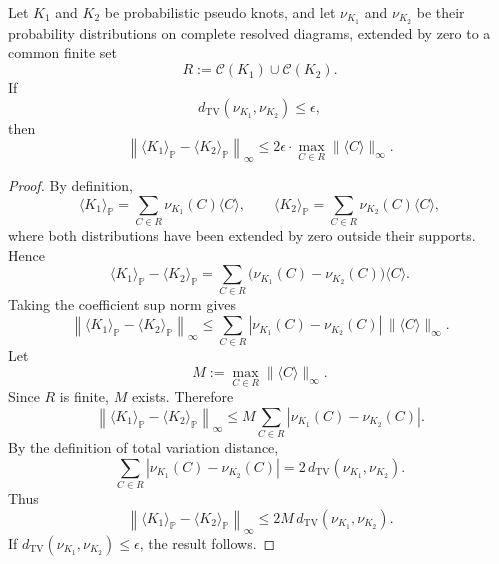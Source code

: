 \documentclass[10pt,a4paper]{amsart}
\begin{document}
\begin{theorem}\label{thm:bracket_diff_bound}
Let \(K_1\) and \(K_2\) be probabilistic pseudo knots, and let \(\nu_{K_1}\) and \(\nu_{K_2}\) be their probability distributions on complete resolved diagrams, extended by zero to a common finite set
\[
R:=\mathcal C(K_1)\cup \mathcal C(K_2).
\]
If
\[
d_{\mathrm{TV}}(\nu_{K_1},\nu_{K_2})\le \epsilon,
\]
then
\[
\left\|
\langle K_1\rangle_{\mathbb P}
-
\langle K_2\rangle_{\mathbb P}
\right\|_\infty
\le
2\epsilon
\cdot
\max_{C\in R}
\|\langle C\rangle\|_\infty .
\]
\end{theorem}

\begin{proof}
By definition,
\[
\langle K_1\rangle_{\mathbb P}
=
\sum_{C\in R}
\nu_{K_1}(C)\langle C\rangle,
\qquad
\langle K_2\rangle_{\mathbb P}
=
\sum_{C\in R}
\nu_{K_2}(C)\langle C\rangle,
\]
where both distributions have been extended by zero outside their supports. Hence
\[
\langle K_1\rangle_{\mathbb P}
-
\langle K_2\rangle_{\mathbb P}
=
\sum_{C\in R}
\big(\nu_{K_1}(C)-\nu_{K_2}(C)\big)
\langle C\rangle .
\]
Taking the coefficient sup norm gives
\[
\left\|
\langle K_1\rangle_{\mathbb P}
-
\langle K_2\rangle_{\mathbb P}
\right\|_\infty
\le
\sum_{C\in R}
|\nu_{K_1}(C)-\nu_{K_2}(C)|
\,\|\langle C\rangle\|_\infty .
\]
Let
\[
M:=
\max_{C\in R}
\|\langle C\rangle\|_\infty .
\]
Since \(R\) is finite, \(M\) exists. Therefore
\[
\left\|
\langle K_1\rangle_{\mathbb P}
-
\langle K_2\rangle_{\mathbb P}
\right\|_\infty
\le
M
\sum_{C\in R}
|\nu_{K_1}(C)-\nu_{K_2}(C)|.
\]
By the definition of total variation distance,
\[
\sum_{C\in R}
|\nu_{K_1}(C)-\nu_{K_2}(C)|
=
2\,d_{\mathrm{TV}}(\nu_{K_1},\nu_{K_2}).
\]
Thus
\[
\left\|
\langle K_1\rangle_{\mathbb P}
-
\langle K_2\rangle_{\mathbb P}
\right\|_\infty
\le
2M\,d_{\mathrm{TV}}(\nu_{K_1},\nu_{K_2}).
\]
If \(d_{\mathrm{TV}}(\nu_{K_1},\nu_{K_2})\le \epsilon\), the result follows.
\end{proof}
\end{document}
